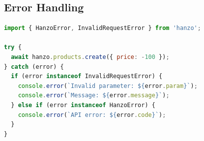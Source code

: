 \subsection{Error Handling}

\begin{lstlisting}[language=JavaScript, caption=JavaScript Error Handling]
import { HanzoError, InvalidRequestError } from 'hanzo';

try {
  await hanzo.products.create({ price: -100 });
} catch (error) {
  if (error instanceof InvalidRequestError) {
    console.error(`Invalid parameter: ${error.param}`);
    console.error(`Message: ${error.message}`);
  } else if (error instanceof HanzoError) {
    console.error(`API error: ${error.code}`);
  }
}
\end{lstlisting}


